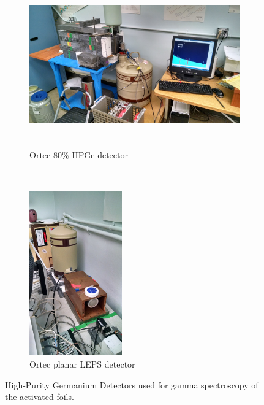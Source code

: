 \documentclass[5p]{elsarticle}
\begin{document}
\begin{figure}[H]
    \centering
    \begin{subfigure}[t]{0.7\textwidth}
        \centering
        \includegraphics[height=2.8in]{./figures/IMG_20160531_182618557_HDR.jpg}
        \caption{ Ortec 80\% HPGe detector}
        \label{fig:hpge_a}
    \end{subfigure}%
    ~ 
    \begin{subfigure}[t]{0.28\textwidth}
        \centering
        \includegraphics[height=2.8in]{./figures/IMG_20160531_182635712_HDR.jpg}
        \caption{Ortec planar LEPS detector}
                \label{fig:hpge_b}
    \end{subfigure}
    \caption{High-Purity Germanium Detectors used for gamma spectroscopy of the activated foils.}
     \label{fig:main_ge_detectors}
\end{figure}
\end{document}
